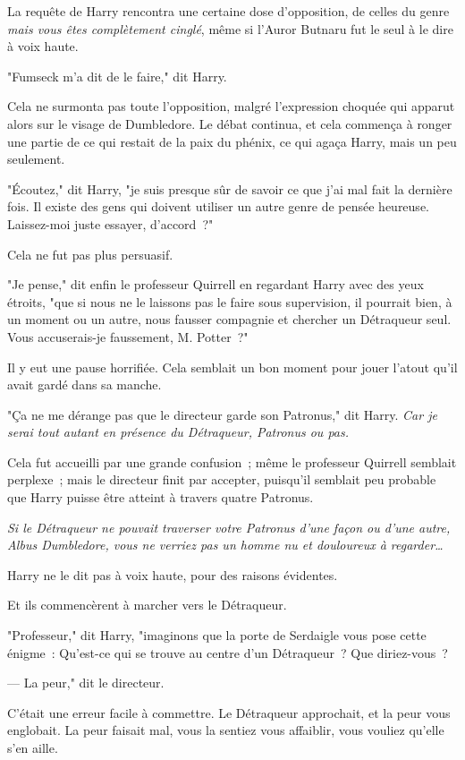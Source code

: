 \later

La requête de Harry rencontra une certaine dose d'opposition, de celles du genre \emph{mais vous êtes complètement cinglé}, même si l'Auror Butnaru fut le seul à le dire à voix haute.

"Fumseck m'a dit de le faire," dit Harry.

Cela ne surmonta pas toute l'opposition, malgré l'expression choquée qui apparut alors sur le visage de Dumbledore. Le débat continua, et cela commença à ronger une partie de ce qui restait de la paix du phénix, ce qui agaça Harry, mais un peu seulement.

"Écoutez," dit Harry, "je suis presque sûr de savoir ce que j'ai mal fait la dernière fois. Il existe des gens qui doivent utiliser un autre genre de pensée heureuse. Laissez-moi juste essayer, d'accord~?"

Cela ne fut pas plus persuasif.

"Je pense," dit enfin le professeur Quirrell en regardant Harry avec des yeux étroits, "que si nous ne le laissons pas le faire sous supervision, il pourrait bien, à un moment ou un autre, nous fausser compagnie et chercher un Détraqueur seul. Vous accuserais-je faussement, M. Potter~?"

Il y eut une pause horrifiée. Cela semblait un bon moment pour jouer l'atout qu'il avait gardé dans sa manche.

"Ça ne me dérange pas que le directeur garde son Patronus," dit Harry. \emph{Car je serai tout autant en présence du Détraqueur, Patronus ou pas.}

Cela fut accueilli par une grande confusion~; même le professeur Quirrell semblait perplexe~; mais le directeur finit par accepter, puisqu'il semblait peu probable que Harry puisse être atteint à travers quatre Patronus.

\emph{Si le Détraqueur ne pouvait traverser votre Patronus d'une façon ou d'une autre, Albus Dumbledore, vous ne verriez pas un homme nu et douloureux à regarder…}

Harry ne le dit pas à voix haute, pour des raisons évidentes.

Et ils commencèrent à marcher vers le Détraqueur.

"Professeur," dit Harry, "imaginons que la porte de Serdaigle vous pose cette énigme~: Qu'est-ce qui se trouve au centre d'un Détraqueur~? Que diriez-vous~?

--- La peur," dit le directeur.

C'était une erreur facile à commettre. Le Détraqueur approchait, et la peur vous englobait. La peur faisait mal, vous la sentiez vous affaiblir, vous vouliez qu'elle s'en aille.

